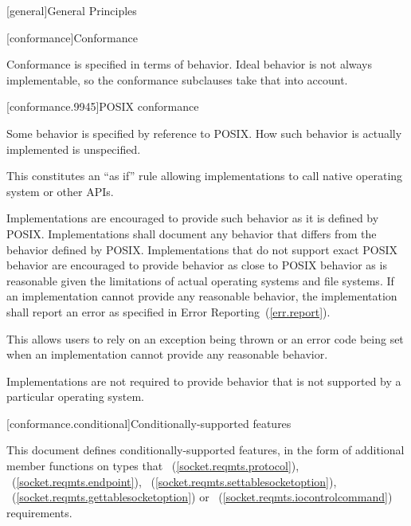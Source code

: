 
[general]{General Principles}

[conformance]{Conformance}

\pnum
 Conformance is specified in terms of behavior. Ideal behavior is not always implementable, so the conformance subclauses take that into account.


[conformance.9945]{POSIX conformance}

\pnum
 Some behavior is specified by reference to POSIX. How such behavior is actually implemented is unspecified.

\pnum
 \begin{note} This constitutes an ``as if'' rule allowing implementations to call native operating system or other APIs. \end{note}

\pnum
Implementations are encouraged to provide such behavior as it is defined by POSIX. Implementations shall document any behavior that differs from the behavior defined by POSIX. Implementations that do not support exact POSIX behavior are encouraged to provide behavior as close to POSIX behavior as is reasonable given the limitations of actual operating systems and file systems. If an implementation cannot provide any reasonable behavior, the implementation shall report an error as specified in Error Reporting~(\ref{err.report}).

\pnum
 \begin{note} This allows users to rely on an exception being thrown or an error code being set when an implementation cannot provide any reasonable behavior. \end{note}

\pnum
 Implementations are not required to provide behavior that is not supported by a particular operating system.



[conformance.conditional]{Conditionally-supported features}

\pnum
This document defines conditionally-supported features, in the form of additional member functions on types that  ~(\ref{socket.reqmts.protocol}), ~(\ref{socket.reqmts.endpoint}), ~(\ref{socket.reqmts.settablesocketoption}), ~(\ref{socket.reqmts.gettablesocketoption}) or ~(\ref{socket.reqmts.iocontrolcommand}) requirements.

